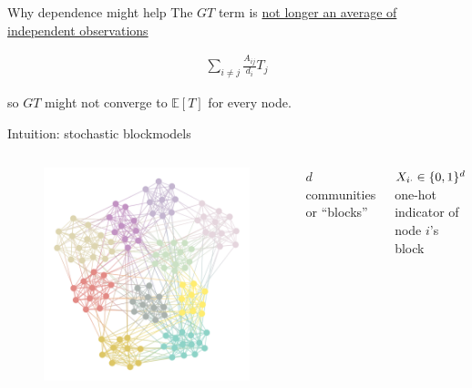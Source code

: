 \documentclass[aspectratio=169]{beamer}
\theoremstyle{remark}
\begin{document}
\begin{frame}{Why dependence might help}
    The $GT$ term is \underline{not longer an average of independent observations}
    
    \begin{align*}
        \sum_{i \neq j} \frac{A_{ij}}{d_i} T_j                 
    \end{align*}
    
    so $GT$ might not converge to $\mathbb E[T]$ for every node.
\end{frame}


\begin{frame}{Intuition: stochastic blockmodels}
    
    \begin{columns}
        
        \begin{figure}
            \includegraphics[width=\textwidth]{figures/assortative.png}
        \end{figure}
        
        
        $d$ communities or ``blocks''
        
        $X_{i \cdot} \in \{0, 1\}^d$ one-hot indicator of node $i$'s block
        

\end{columns}
\end{frame}
\end{document}
